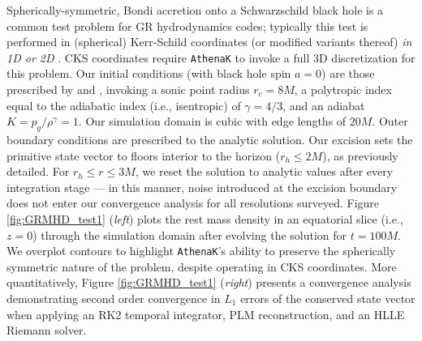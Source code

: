 \documentclass[twocolumn, floatfix]{aastex63}
\newcommand{\ak}{\texttt{AthenaK}}
\begin{document}
Spherically-symmetric, Bondi accretion onto a Schwarzschild black hole is a common test problem for GR hydrodynamics codes;  typically this test is performed in (spherical) Kerr-Schild coordinates (or modified variants thereof) \textit{in 1D or 2D} \citep[e.g.,][to name a few]{2003ApJ...589..444G, WhiteStone2016, 2017ComAC...4....1P, 2021JOSS....6.3336P, 2024MNRAS.532.3198C}.  CKS coordinates require \ak{} to invoke a full 3D discretization for this problem.   Our initial conditions (with black hole spin $a = 0$) are those prescribed by \cite{1984ApJ...277..296H} and \cite{WhiteStone2016}, invoking a sonic point radius $r_c = 8M$, a polytropic index equal to the adiabatic index (i.e., isentropic) of $\gamma = 4/3$, and an adiabat $K = p_g / \rho^\gamma = 1$.   Our simulation domain is cubic with edge lengths of $20M$.  Outer boundary conditions are prescribed to the analytic solution.  Our excision sets the primitive state vector to floors interior to the horizon ($r_h \leq 2M$), as previously detailed.   For $r_h \leq r \leq 3M$, we reset the solution to analytic values after every integration stage --- in this manner, noise introduced at the excision boundary does not enter our convergence analysis for all resolutions surveyed.  Figure \ref{fig:GRMHD_test1} (\textit{left}) plots the rest mass density in an equatorial slice (i.e., $z=0$) through the simulation domain after evolving the solution for $t = 100M$.  We overplot contours to highlight \ak{}'s ability to preserve the spherically symmetric nature of the problem, despite operating in CKS coordinates.  More quantitatively, Figure \ref{fig:GRMHD_test1} (\textit{right}) presents a convergence analysis demonstrating second order convergence in $L_1$ errors of the conserved state vector when applying an RK2 temporal integrator, PLM reconstruction, and an HLLE Riemann solver.  
\end{document}
